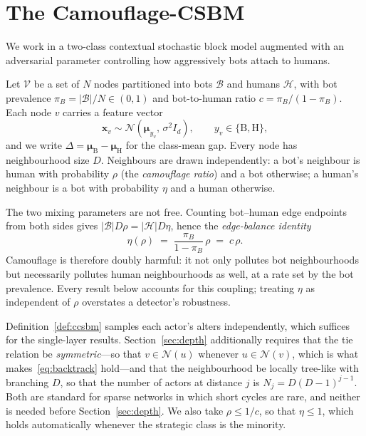 \documentclass[../elsevier.tex]{subfiles}
\begin{document}
\section{The Camouflage-CSBM}
\label{sec:model}

We work in a two-class contextual stochastic block model augmented with an
adversarial parameter controlling how aggressively bots attach to humans.

\begin{definition}
\label{def:ccsbm}
Let $\mathcal{V}$ be a set of $N$ nodes partitioned into bots $\mathcal{B}$ and
humans $\mathcal{H}$, with bot prevalence $\pi_B = |\mathcal{B}|/N \in (0,1)$ and
bot-to-human ratio $c = \pi_B/(1-\pi_B)$. Each node $v$ carries a feature vector
\begin{equation}
    \mathbf{x}_v \sim \mathcal{N}(\boldsymbol{\mu}_{y_v},\, \sigma^2 I_d),
    \qquad y_v \in \{\mathrm{B}, \mathrm{H}\},
\end{equation}
and we write $\Delta = \boldsymbol{\mu}_{\mathrm{B}} - \boldsymbol{\mu}_{\mathrm{H}}$
for the class-mean gap. Every node has neighbourhood size $D$. Neighbours are drawn
independently: a bot's neighbour is human with probability $\rho$ (the
\emph{camouflage ratio}) and a bot otherwise; a human's neighbour is a bot with
probability $\eta$ and a human otherwise.
\end{definition}

The two mixing parameters are not free. Counting bot--human edge endpoints from
both sides gives $|\mathcal{B}| D \rho = |\mathcal{H}| D \eta$, hence the
\emph{edge-balance identity}
\begin{equation}
    \eta(\rho) \;=\; \frac{\pi_B}{1-\pi_B}\,\rho \;=\; c\,\rho .
    \label{eq:balance}
\end{equation}
Camouflage is therefore doubly harmful: it not only pollutes bot neighbourhoods but
necessarily pollutes human neighbourhoods as well, at a rate set by the bot
prevalence. Every result below accounts for this coupling; treating $\eta$ as
independent of $\rho$ overstates a detector's robustness.

\begin{assumption}
\label{as:tree}
Definition~\ref{def:ccsbm} samples each actor's alters independently, which suffices
for the single-layer results. Section~\ref{sec:depth} additionally requires that the
tie relation be \emph{symmetric}---so that $v \in \mathcal{N}(u)$ whenever
$u \in \mathcal{N}(v)$, which is what makes~\eqref{eq:backtrack} hold---and that the
neighbourhood be locally tree-like with branching $D$, so that the number of actors at
distance $j$ is $N_j = D(D-1)^{j-1}$. Both are standard for sparse networks in which
short cycles are rare, and neither is needed before Section~\ref{sec:depth}. We also
take $\rho \le 1/c$, so that $\eta \le 1$, which holds automatically whenever the
strategic class is the minority.
\end{assumption}
\end{document}

